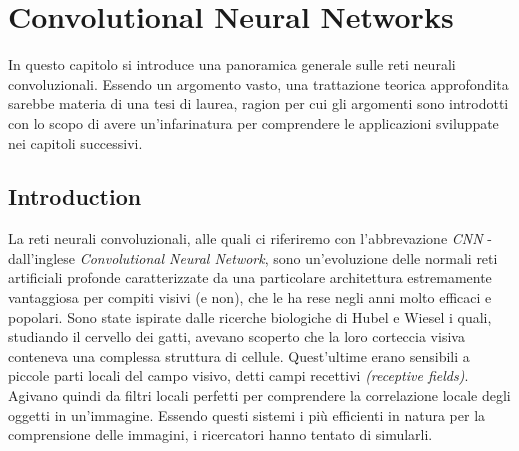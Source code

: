 
\chapter{Convolutional Neural Networks} %
\label{Chapter3}
\def \teoria {Figures/teoria}
\def \path	 {Figures/C3}
In questo capitolo si introduce una panoramica generale sulle reti neurali convoluzionali. Essendo un argomento vasto, una trattazione teorica approfondita sarebbe materia di una tesi di laurea, ragion per cui gli argomenti sono introdotti con lo scopo di avere un'infarinatura per comprendere le applicazioni sviluppate nei capitoli successivi. 
\section{Introduction}
La reti neurali convoluzionali, alle quali ci riferiremo con l'abbrevazione \emph{CNN} - dall'inglese \emph{Convolutional Neural Network}, sono un'evoluzione delle normali reti artificiali profonde caratterizzate da una particolare architettura estremamente vantaggiosa per compiti visivi (e non), che le ha rese negli anni molto efficaci e popolari. Sono state ispirate dalle ricerche biologiche di Hubel e Wiesel i quali, studiando il cervello dei gatti, avevano scoperto che la loro corteccia visiva conteneva una complessa struttura di cellule. Quest'ultime erano sensibili a piccole parti locali del campo visivo, detti campi recettivi \emph{(receptive fields)}. Agivano quindi da filtri locali perfetti per comprendere la correlazione locale degli oggetti in un'immagine. Essendo questi sistemi i più efficienti in natura per la comprensione delle immagini, i ricercatori hanno tentato di simularli. 


